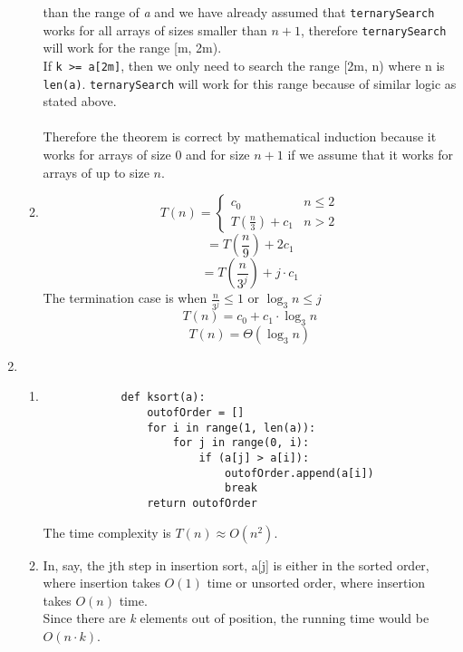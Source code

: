 \documentclass[11pt, letterpaper]{article}
\begin{document}
\begin{enumerate}
\begin{enumerate}
            than the range of \textit{a} and we have already assumed that \texttt{ternarySearch} works for all arrays of sizes smaller
            than $n+1$, therefore \texttt{ternarySearch} will work for the range [m, 2m). \\
            If \texttt{k >= a[2m]}, then we only need to search the range [2m, n) where n is \texttt{len(a)}. \texttt{ternarySearch}
            will work for this range because of similar logic as stated above. \\ \\
            Therefore the theorem is correct by mathematical induction because it works for arrays of size 0 and for size $n+1$ if
            we assume that it works for arrays of up to size $n$.

        \item
            \[ T(n) = \begin{cases}
                        c_0 & n \leq 2 \\
                        T\left(\frac{n}{3}\right) + c_1 & n > 2
                      \end{cases} \]
            \[ = T\left(\frac{n}{9} \right) + 2c_1 \]
            \[ = T\left(\frac{n}{3^j} \right) + j\cdot c_1 \]
            The termination case is when $\frac{n}{3^j} \leq 1$ or $\log _3 n \leq j$
            \[ T(n) = c_0 + c_1\cdot \log _3 n \]
            \[ \boxed{ T(n) = \Theta (\log _3 n) } \]
      \end{enumerate}

    \item
      \begin{enumerate}
        \item
          \begin{lstlisting}
            def ksort(a):
                outofOrder = []
                for i in range(1, len(a)):
                    for j in range(0, i):
                        if (a[j] > a[i]):
                            outofOrder.append(a[i])
                            break
                return outofOrder
          \end{lstlisting}
          The time complexity is $T(n) \approx O(n^2)$.

        \item In, say, the jth step in insertion sort, a[j] is either in the sorted order, where insertion takes $O(1)$ time
              or unsorted order, where insertion takes $O(n)$ time. \\
              Since there are \textit{k} elements out of position, the running time would be $O(n\cdot k)$.


\end{enumerate}
\end{enumerate}
\end{document}
